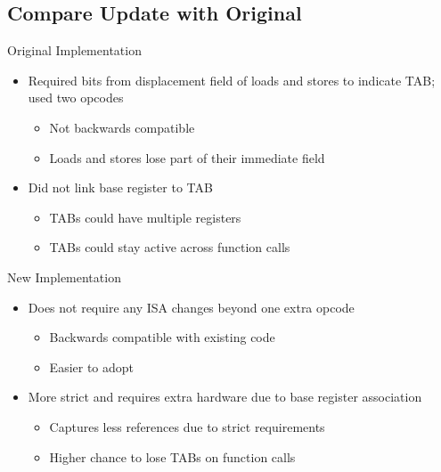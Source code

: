 \documentclass{beamer}
\begin{document}
\subsection{Compare Update with Original}
\begin{frame}{Original Implementation}
      \begin{itemize}
         \item Required bits from displacement field of loads and stores to 
            indicate TAB; used two opcodes
            \begin{itemize}
               \item Not backwards compatible
               \item Loads and stores lose part of their immediate field
            \end{itemize}
         \item Did not link base register to TAB
            \begin{itemize}
               \item TABs could have multiple registers
               \item TABs could stay active across function calls
            \end{itemize}
      \end{itemize}
   \end{frame}
      \begin{frame}{New Implementation}
      \begin{itemize}
         \item Does not require any ISA changes beyond one extra opcode
            \begin{itemize}
               \item Backwards compatible with existing code
               \item Easier to adopt
            \end{itemize}
         \item More strict and requires extra hardware due to base register association
            \begin{itemize}
               \item Captures less references due to strict requirements
               \item Higher chance to lose TABs on function calls
            \end{itemize}
      \end{itemize}
\end{frame}
\end{document}
